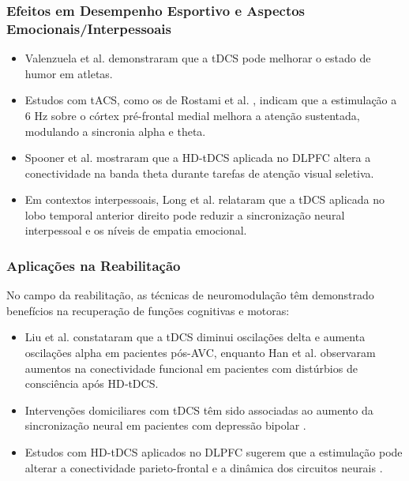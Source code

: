 \subsubsection{Efeitos em Desempenho Esportivo e Aspectos Emocionais/Interpessoais}
\begin{itemize}
    \item Valenzuela et al. \cite{valenzuela2019enhancement} demonstraram que a tDCS pode melhorar o estado de humor em atletas.
    \item Estudos com tACS, como os de Rostami et al. \cite{rostami2020transcranial}, indicam que a estimulação a 6 Hz sobre o córtex pré-frontal medial melhora a atenção sustentada, modulando a sincronia alpha e theta.
    \item Spooner et al. \cite{spooner2020hdtdcs} mostraram que a HD-tDCS aplicada no DLPFC altera a conectividade na banda theta durante tarefas de atenção visual seletiva.
    \item Em contextos interpessoais, Long et al. \cite{long2023transcranial} relataram que a tDCS aplicada no lobo temporal anterior direito pode reduzir a sincronização neural interpessoal e os níveis de empatia emocional.
\end{itemize}

\subsubsection{Aplicações na Reabilitação}
No campo da reabilitação, as técnicas de neuromodulação têm demonstrado benefícios na recuperação de funções cognitivas e motoras:
\begin{itemize}
    \item Liu et al. \cite{liu2023effects} constataram que a tDCS diminui oscilações delta e aumenta oscilações alpha em pacientes pós-AVC, enquanto Han et al. \cite{han2022functional} observaram aumentos na conectividade funcional em pacientes com distúrbios de consciência após HD‑tDCS.
    \item Intervenções domiciliares com tDCS têm sido associadas ao aumento da sincronização neural em pacientes com depressão bipolar \cite{xiao2025enhanced}.
    \item Estudos com HD-tDCS aplicados no DLPFC sugerem que a estimulação pode alterar a conectividade parieto-frontal e a dinâmica dos circuitos neurais \cite{arif2021high}.
\end{itemize}

